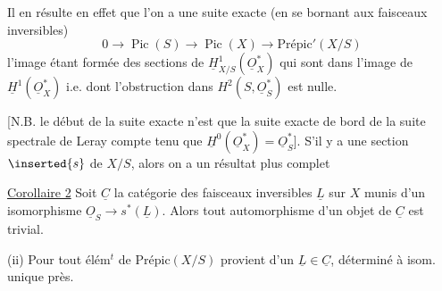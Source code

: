Il en résulte en effet que l'on a une suite exacte (en se bornant aux faisceaux inversibles)
\[
0\longrightarrow\operatorname{Pic}(S)\longrightarrow\operatorname{Pic}(X)\longrightarrow\mathrm{Prépic}'(X/S)
\]
l'image  étant formée des sections de $\underline H^1_{X/S}(\underline O_X^*)$ qui sont dans l'image de $\underline H^1(\underline O_X^*)$ i.e. dont l'obstruction dans $H^2(S,\underline O_S^*)$ est nulle.

[N.B. le début de la suite exacte n'est que la suite exacte de bord de la suite spectrale de Leray
compte tenu que $\underline H^0(\underline O_X^*)=\underline O_S^*$]. S'il y a une section $\inserted{s}$ de $X/S$, alors on  a un résultat plus complet

\uline{Corollaire 2} Soit $\underline C$ la catégorie des faisceaux inversibles $\underline L$ sur $X$ munis d'un isomorphisme $\underline O_S\to s^*(\underline L)$. Alors  tout automorphisme d'un objet de $\underline C$ est trivial.

(ii) Pour  tout élém$^t$ de $\mathrm{Prépic}(X/S)$ provient d'un $\underline L\in\underline C$, déterminé à isom. unique près.

